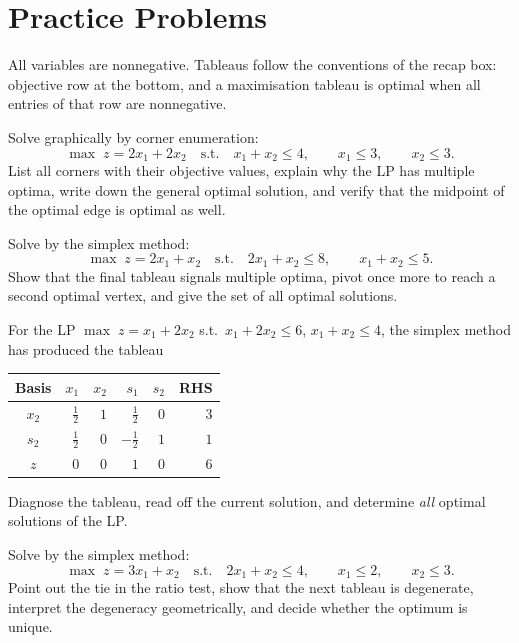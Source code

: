 \section{Practice Problems}

All variables are nonnegative. Tableaus follow the conventions of the recap
box: objective row at the bottom, and a maximisation tableau is optimal
when all entries of that row are nonnegative.

\begin{problems}
  \item Solve graphically by corner enumeration:
        \[
          \max\; z=2x_1+2x_2
          \quad\text{s.t.}\quad
          x_1+x_2\le 4,\qquad x_1\le 3,\qquad x_2\le 3 .
        \]
        List all corners with their objective values, explain why the LP
        has multiple optima, write down the general optimal solution, and
        verify that the midpoint of the optimal edge is optimal as well.

  \item Solve by the simplex method:
        \[
          \max\; z=2x_1+x_2
          \quad\text{s.t.}\quad
          2x_1+x_2\le 8,\qquad x_1+x_2\le 5 .
        \]
        Show that the final tableau signals multiple optima, pivot once
        more to reach a second optimal vertex, and give the set of all
        optimal solutions.

  \item For the LP
        $\max\; z=x_1+2x_2$ s.t.\ $x_1+2x_2\le 6$, $x_1+x_2\le 4$,
        the simplex method has produced the tableau
        \begin{center}
        \begin{tabular}{c|rrrr|r}
        \hline
        Basis & $x_1$ & $x_2$ & $s_1$ & $s_2$ & RHS\\
        \hline
        $x_2$ & $\tfrac{1}{2}$ & $1$ & $\tfrac{1}{2}$ & $0$ & $3$\\
        $s_2$ & $\tfrac{1}{2}$ & $0$ & $-\tfrac{1}{2}$ & $1$ & $1$\\
        \hline
        $z$ & $0$ & $0$ & $1$ & $0$ & $6$\\
        \hline
        \end{tabular}
        \end{center}
        Diagnose the tableau, read off the current solution, and determine
        \emph{all} optimal solutions of the LP.

  \item Solve by the simplex method:
        \[
          \max\; z=3x_1+x_2
          \quad\text{s.t.}\quad
          2x_1+x_2\le 4,\qquad x_1\le 2,\qquad x_2\le 3 .
        \]
        Point out the tie in the ratio test, show that the next tableau is
        degenerate, interpret the degeneracy geometrically, and decide
        whether the optimum is unique.


\end{problems}
